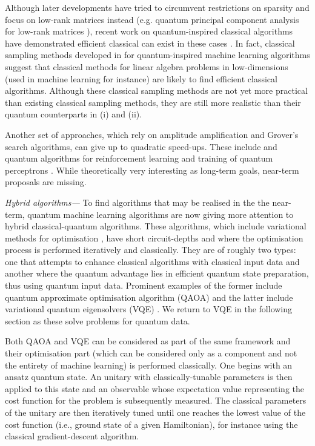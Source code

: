 \documentclass[twocolumn, aps, rmp, amsmath, amssymb, nofootinbib, superscriptaddress, longbibliography, floatfix, table-of-contents, eqsecnum]{revtex4-2}
\begin{document}
Although later developments have tried to circumvent restrictions on sparsity and focus on low-rank matrices instead (e.g. quantum principal component analysis for low-rank matrices \cite{lloyd2014quantum}), recent work on quantum-inspired classical algorithms have demonstrated efficient classical can exist in these cases \cite{tang2018quantum, gilyen2018quantum, chia2018quantum}. In fact, classical sampling methods developed in \cite{tang2018quantum} for quantum-inspired machine learning algorithms suggest that classical methods for linear algebra problems in low-dimensions (used in machine learning for instance) are likely to find efficient classical algorithms. Although these classical sampling methods are not yet more practical than existing classical sampling methods, they are still more realistic than their quantum counterparts in (i) and (ii).

Another set of approaches, which rely on amplitude amplification and Grover's search algorithms, can give up to quadratic speed-ups. These include and quantum algorithms for reinforcement learning \cite{dunjko2016quantum} and training of quantum perceptrons \cite{kapoor2016quantum}. While theoretically very interesting as long-term goals, near-term proposals are missing.

\textit{Hybrid algorithms---} To find algorithms that may be realised in the the near-term, quantum machine learning algorithms are now giving more attention to hybrid classical-quantum algorithms. These algorithms, which include variational methods for optimisation \cite{moll2018quantum}, have short circuit-depths and where the optimisation process is performed iteratively and classically. They are of roughly two types: one that attempts to enhance classical algorithms with classical input data and another where the quantum advantage lies in efficient quantum state preparation, thus using quantum input data. Prominent examples of the former include quantum approximate optimisation algorithm (QAOA) \cite{farhi2014quantum, farhi2016quantum} and the latter include variational quantum eigensolvers (VQE) \cite{peruzzo2014peruzzo, kandala2017hardware}. We return to VQE in the following section as these solve problems for quantum data.

Both QAOA and VQE can be considered as part of the same framework and their optimisation part (which can be considered only as a component and not the entirety of machine learning) is performed classically. One begins with an ansatz quantum state. An unitary with classically-tunable parameters is then applied to this state and an observable whose expectation value representing the cost function for the problem is subsequently measured. The classical parameters of the unitary are then iteratively tuned until one reaches the lowest value of the cost function (i.e., ground state of a given Hamiltonian), for instance using the classical gradient-descent algorithm. \
\end{document}
